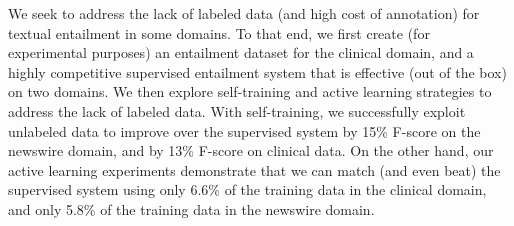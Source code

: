 We seek to address the lack of labeled data (and high cost of annotation) for textual entailment in some domains. To that end, we first create (for experimental purposes) an entailment dataset for the clinical domain, and a highly competitive supervised entailment system that is effective (out of the box) on two domains. We then explore self-training and active learning strategies to address the lack of labeled data. With self-training, we successfully exploit unlabeled data to improve over the supervised system by 15\% F-score on the newswire domain, and by 13\% F-score on clinical data. On the other hand, our active learning experiments demonstrate that we can match (and even beat) the supervised system using only 6.6\% of the training data in the clinical domain, and only 5.8\% of the training data in the newswire domain.
